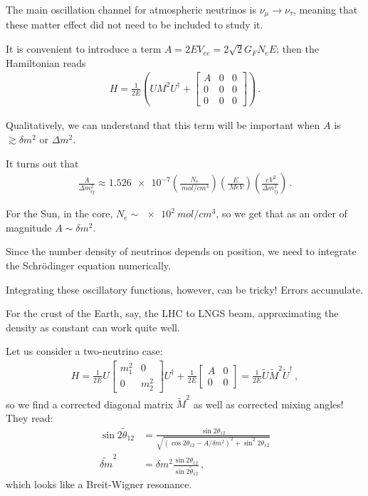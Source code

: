 \documentclass[main.tex]{subfiles}
\begin{document}
The main oscillation channel for atmospheric neutrinos is \(\nu _\mu \to \nu _\tau \), 
meaning that these matter effect did not need to be included to study it. 

It is convenient to introduce a term \(A = 2 E V_{ee} = 2 \sqrt{2} G_F N_e E\); then the Hamiltonian reads 
%
\begin{align}
H = \frac{1}{2E} \left( U M^2 U ^\dag + \left[\begin{array}{ccc}
A & 0 & 0 \\ 
0 & 0 & 0 \\ 
0 & 0 & 0
\end{array}\right] \right)
\,.
\end{align}
%

Qualitatively, we can understand that this term will be important when \(A\) 
is \(\gtrsim \delta m^2\) or \(\Delta m^2\). 

It turns out that 
%
\begin{align}
\frac{A}{\Delta m^2_{ij}} \approx \num{1.526e-7} \left( \frac{N_e}{\SI{}{mol/cm^3}}\right) 
\left( \frac{E}{\SI{}{MeV}}\right)
\left( \frac{\SI{}{eV^2}}{\Delta m^2_{ij}} \right)
\,.
\end{align}

For the Sun, in the core, \(N_e \sim \SI{e2}{mol/cm^3}\), so we get that as an order of magnitude \(A \sim \delta m^2\). 

Since the number density of neutrinos depends on position, we need to integrate the Schrödinger equation numerically. 

Integrating these oscillatory functions, however, can be tricky! 
Errors accumulate. 

For the crust of the Earth, say, the LHC to LNGS beam, approximating the density as constant can work quite well. 

Let us consider a two-neutrino case: 
%
\begin{align}
H = \frac{1}{2E} U \left[\begin{array}{cc}
m_1^2 & 0 \\ 
0 & m_2 ^2
\end{array}\right]
U ^\dag
+ \frac{1}{2E}
\left[\begin{array}{cc}
A & 0 \\ 
0 & 0
\end{array}\right]
= \frac{1}{2E} \widetilde{U} \widetilde{M}^2 \widetilde{U} ^\dag
\,,
\end{align}
%
so we find a corrected diagonal matrix \(\widetilde{M}^2\) as well as corrected mixing angles! 
They read:
%
\begin{align}
\sin 2 \widetilde{\theta}_{12} &= \frac{\sin 2 \theta_{12} }{\sqrt{(\cos 2 \theta_{12} - A / \delta m^2)^2 + \sin^2 2 \theta_{12} }}  \\
\widetilde{\delta m}^2 &= \delta m^2 \frac{\sin 2 \theta_{12} }{\sin 2 \widetilde{\theta}_{12}}
\,,
\end{align}
%
which looks like a Breit-Wigner resonance.
\end{document}
